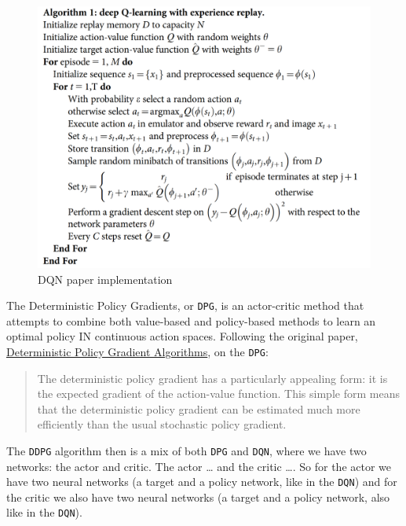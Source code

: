 \documentclass[
]{article}
\begin{document}
\begin{figure}
\centering
\includegraphics{imgs/dqn_print_1.png}
\caption{DQN paper implementation}
\end{figure}

The Deterministic Policy Gradients, or \texttt{DPG}, is an actor-critic
method that attempts to combine both value-based and policy-based
methods to learn an optimal policy IN continuous action spaces.
Following the original paper,
\href{http://proceedings.mlr.press/v32/silver14.pdf}{Deterministic
Policy Gradient Algorithms}, on the \texttt{DPG}:

\begin{quote}
The deterministic policy gradient has a particularly appealing form: it
is the expected gradient of the action-value function. This simple form
means that the deterministic policy gradient can be estimated much more
efficiently than the usual stochastic policy gradient.
\end{quote}

The \texttt{DDPG} algorithm then is a mix of both \texttt{DPG} and
\texttt{DQN}, where we have two networks: the actor and critic. The
actor \ldots{} and the critic \ldots. So for the actor we have two
neural networks (a target and a policy network, like in the
\texttt{DQN}) and for the critic we also have two neural networks (a
target and a policy network, also like in the \texttt{DQN}).
\end{document}
